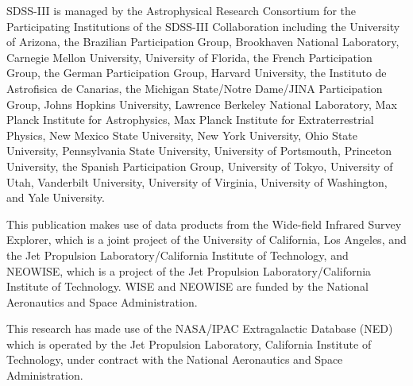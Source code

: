 \documentclass[11pt,a4paper]{article}
\begin{document}
SDSS-III is managed by the Astrophysical Research Consortium for the
Participating Institutions of the SDSS-III Collaboration including the
University of Arizona, the Brazilian Participation Group, Brookhaven
National Laboratory, Carnegie Mellon University, University of
Florida, the French Participation Group, the German Participation
Group, Harvard University, the Instituto de Astrofisica de Canarias,
the Michigan State/Notre Dame/JINA Participation Group, Johns Hopkins
University, Lawrence Berkeley National Laboratory, Max Planck
Institute for Astrophysics, Max Planck Institute for Extraterrestrial
Physics, New Mexico State University, New York University, Ohio State
University, Pennsylvania State University, University of Portsmouth,
Princeton University, the Spanish Participation Group, University of
Tokyo, University of Utah, Vanderbilt University, University of
Virginia, University of Washington, and Yale University.

This publication makes use of data products from the Wide-field
Infrared Survey Explorer, which is a joint project of the University
of California, Los Angeles, and the Jet Propulsion
Laboratory/California Institute of Technology, and NEOWISE, which is a
project of the Jet Propulsion Laboratory/California Institute of
Technology. WISE and NEOWISE are funded by the National Aeronautics
and Space Administration.

This research has made use of the NASA/IPAC Extragalactic Database
(NED) which is operated by the Jet Propulsion Laboratory, California
Institute of Technology, under contract with the National Aeronautics
and Space Administration.





\end{document}
